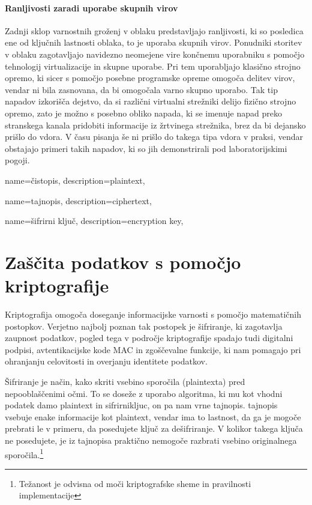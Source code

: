 \documentclass[12pt,a4paper,openany]{book}
\begin{document}
\subsubsection{Ranljivosti zaradi uporabe skupnih virov}
Zadnji sklop varnostnih groženj v oblaku predstavljajo ranljivosti, ki so posledica ene od ključnih lastnosti oblaka, to je uporaba skupnih virov. Ponudniki storitev v oblaku zagotavljajo navidezno neomejene vire končnemu uporabniku s pomočjo tehnologij virtualizacije in skupne uporabe. Pri tem uporabljajo klasično strojno opremo, ki sicer s pomočjo posebne programske opreme omogoča delitev virov, vendar ni bila zasnovana, da bi omogočala varno skupno uporabo. Tak tip napadov izkorišča dejstvo, da si različni virtualni strežniki delijo fizično strojno opremo, zato je možno s posebno obliko napada, ki se imenuje napad preko stranskega kanala pridobiti informacije iz žrtvinega strežnika, brez da bi dejansko prišlo do vdora. V času pisanja še ni prišlo do takega tipa vdora v praksi, vendar obstajajo primeri takih napadov, ki so jih demonstrirali pod laboratorijskimi pogoji.


{
  name=čistopis,
  description={plaintext},
}


{
  name=tajnopis,
  description={ciphertext},
}

{
  name=šifrirni ključ,
  description={encryption key},
}


\chapter{Zaščita podatkov s pomočjo kriptografije}

Kriptografija omogoča doseganje informacijske varnosti s pomočjo matematičnih postopkov. Verjetno najbolj poznan tak postopek je šifriranje, ki zagotavlja zaupnost podatkov, pogled tega v področje kriptografije spadajo tudi digitalni podpisi, avtentikacijske kode MAC in zgoščevalne funkcije, ki nam pomagajo pri ohranjanju celovitosti in overjanju identitete podatkov.

Šifriranje je način, kako skriti vsebino sporočila (\gls{plaintext}a) pred nepooblaščenimi očmi. To se doseže z uporabo algoritma, ki mu kot vhodni podatek damo \gls{plaintext} in \gls{sifrirnikljuc}, on pa nam vrne \gls{tajnopis}. \Gls{tajnopis} vsebuje enake informacije kot \gls{plaintext}, vendar ima to lastnost, da ga je mogoče prebrati le v primeru, da posedujete ključ za dešifriranje. V kolikor takega ključa ne posedujete, je iz \gls{tajnopis}a praktično nemogoče razbrati vsebino originalnega sporočila.\footnote{Težanost je odvisna od moči kriptografske sheme in pravilnosti implementacije}
\end{document}
